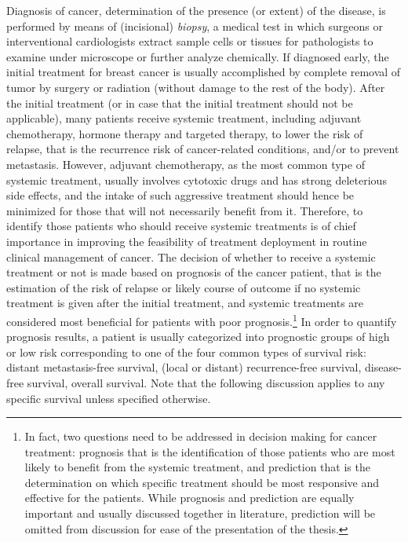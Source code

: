Diagnosis of cancer, determination of the presence (or extent) of the disease, is performed by means of (incisional) \textit{biopsy}, a medical test in which surgeons or interventional cardiologists extract sample cells or tissues for pathologists to examine under microscope or further analyze chemically. If diagnosed early, the initial treatment for breast cancer is usually accomplished by complete removal of tumor by surgery or radiation (without damage to the rest of the body). After the initial treatment (or in case that the initial treatment should not be applicable), many patients receive systemic treatment, including adjuvant chemotherapy, hormone therapy and targeted therapy, to lower the risk of relapse, that is the recurrence risk of cancer-related conditions, and/or to prevent metastasis. However, adjuvant chemotherapy, as the most common type of systemic treatment, usually involves cytotoxic drugs and has strong deleterious side effects, and the intake of such aggressive treatment should hence be minimized for those that will not necessarily benefit from it. Therefore, to identify those patients who should receive systemic treatments is of chief importance in improving the feasibility of treatment deployment in routine clinical management of cancer. The decision of whether to receive a systemic treatment or not is made based on prognosis of the cancer patient, that is the estimation of the risk of relapse or likely course of outcome if no systemic treatment is given after the initial treatment, and systemic treatments are considered most beneficial for patients with poor prognosis.\footnote{In fact, two questions need to be addressed in decision making for cancer treatment: prognosis that is the identification of those patients who are most likely to benefit from the systemic treatment, and prediction that is the determination on which specific treatment should be most responsive and effective for the patients. While prognosis and prediction are equally important and usually discussed together in literature, prediction will be omitted from discussion for ease of the presentation of the thesis.} In order to quantify prognosis results, a patient is usually categorized into prognostic groups of high or low risk corresponding to one of the four common types of survival risk: distant metastasis-free survival, (local or distant) recurrence-free survival, disease-free survival, overall survival. Note that the following discussion applies to any specific survival unless specified otherwise.


